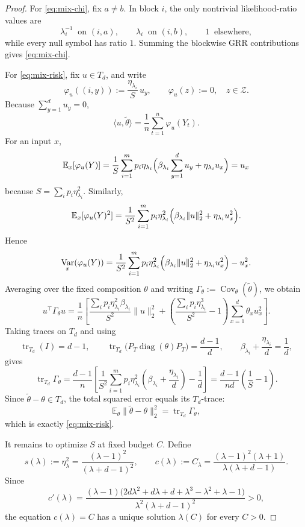 \documentclass[10pt,a4paper]{amsart}
\DeclareMathOperator{\Cov}{Cov}
\newcommand{\E}{\mathbb E}
\DeclareMathOperator{\Var}{Var}
\DeclareMathOperator{\diag}{diag}
\begin{document}
\begin{proof}
For \eqref{eq:mix-chi}, fix \(a\neq b\).
In block \(i\), the only nontrivial likelihood-ratio values are
\[
\lambda_i^{-1}\ \text{ on } (i,a),\qquad
\lambda_i\ \text{ on } (i,b),\qquad
1\ \text{ elsewhere},
\]
while every null symbol has ratio \(1\).  Summing the blockwise GRR contributions gives
\eqref{eq:mix-chi}.

For \eqref{eq:mix-risk}, fix \(u\in T_d\), and write
\[
\varphi_u((i,y)):=\frac{\eta_{\lambda_i}}{S}\,u_y,
\qquad
\varphi_u(z):=0,\quad z\in\mathcal Z.
\]
Because \(\sum_{y=1}^d u_y=0\),
\[
\langle u,\widetilde\theta\rangle
=
\frac{1}{n}\sum_{t=1}^n \varphi_u(Y_t).
\]
For an input \(x\),
\[
\E_x[\varphi_u(Y)]
=
\frac{1}{S}\sum_{i=1}^m p_i\eta_{\lambda_i}
\Bigl(\beta_{\lambda_i}\sum_{y=1}^d u_y+\eta_{\lambda_i}u_x\Bigr)
=
u_x
\]
because \(S=\sum_i p_i\eta_{\lambda_i}^2\).
Similarly,
\[
\E_x[\varphi_u(Y)^2]
=
\frac{1}{S^2}\sum_{i=1}^m p_i\eta_{\lambda_i}^2
\Bigl(\beta_{\lambda_i}\|u\|_2^2+\eta_{\lambda_i}u_x^2\Bigr).
\]
Hence
\[
\Var_x(\varphi_u(Y))
=
\frac{1}{S^2}\sum_{i=1}^m p_i\eta_{\lambda_i}^2
\Bigl(\beta_{\lambda_i}\|u\|_2^2+\eta_{\lambda_i}u_x^2\Bigr)-u_x^2.
\]
Averaging over the fixed composition \(\theta\) and writing
\(\Gamma_\theta:=\Cov_\theta(\widetilde\theta)\),
we obtain
\[
u^\top\Gamma_\theta u
=
\frac{1}{n}
\left[
\frac{\sum_i p_i\eta_{\lambda_i}^2\beta_{\lambda_i}}{S^2}\|u\|_2^2
+
\left(
\frac{\sum_i p_i\eta_{\lambda_i}^3}{S^2}-1
\right)
\sum_{x=1}^d \theta_x u_x^2
\right].
\]
Taking traces on \(T_d\) and using
\[
\operatorname{tr}_{T_d}(I)=d-1,
\qquad
\operatorname{tr}_{T_d}\!\bigl(P_T\diag(\theta)P_T\bigr)=\frac{d-1}{d},
\qquad
\beta_{\lambda_i}+\frac{\eta_{\lambda_i}}{d}=\frac1d,
\]
gives
\[
\operatorname{tr}_{T_d}\Gamma_\theta
=
\frac{d-1}{n}
\left[
\frac{1}{S^2}\sum_{i=1}^m p_i\eta_{\lambda_i}^2
\left(\beta_{\lambda_i}+\frac{\eta_{\lambda_i}}{d}\right)
-\frac1d
\right]
=
\frac{d-1}{nd}\left(\frac{1}{S}-1\right).
\]
Since \(\widetilde\theta-\theta\in T_d\), the total squared error equals its \(T_d\)-trace:
\[
\E_\theta\|\widetilde\theta-\theta\|_2^2
=
\operatorname{tr}_{T_d}\Gamma_\theta,
\]
which is exactly \eqref{eq:mix-risk}.

It remains to optimize \(S\) at fixed budget \(C\).
Define
\[
s(\lambda):=\eta_\lambda^2=\frac{(\lambda-1)^2}{(\lambda+d-1)^2},
\qquad
c(\lambda):=C_\lambda=\frac{(\lambda-1)^2(\lambda+1)}{\lambda(\lambda+d-1)}.
\]
Since
\[
c'(\lambda)
=
\frac{(\lambda-1)\bigl(2d\lambda^2+d\lambda+d+\lambda^3-\lambda^2+\lambda-1\bigr)}
{\lambda^2(\lambda+d-1)^2}
>0,
\]
the equation \(c(\lambda)=C\) has a unique solution \(\lambda(C)\) for every \(C>0\).


\end{proof}
\end{document}
